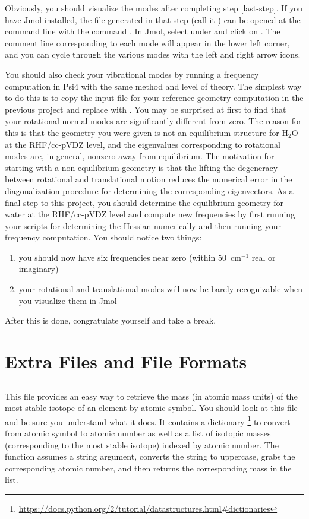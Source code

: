 \documentclass[11pt]{article}
\begin{document}
Obviously, you should visualize the modes after completing step \ref{last-step}.
If you have Jmol installed, the file generated in that step (call it ) can be opened at the command line with the command .
In Jmol, select  under  and click on .
The comment line corresponding to each mode will appear in the lower left corner, and you can cycle through the various modes with the left and right arrow icons.

You should also check your vibrational modes by running a frequency computation in Psi4 with the same method and level of theory.
The simplest way to do this is to copy the input file for your reference geometry computation in the previous project and replace  with .
You may be surprised at first to find that your rotational normal modes are significantly different from zero.
The reason for this is that the geometry you were given is not an equilibrium structure for H$_2$O at the RHF/cc-pVDZ level, and the eigenvalues corresponding to rotational modes are, in general, nonzero away from equilibrium.
The motivation for starting with a non-equilibrium geometry is that the lifting the degeneracy between rotational and translational motion reduces the numerical error in the diagonalization procedure for determining the corresponding eigenvectors.
As a final step to this project, you should determine the equilibrium geometry for water at the RHF/cc-pVDZ level and compute new frequencies by first running your scripts for determining the Hessian numerically and then running your frequency computation.
You should notice two things:
\begin{enumerate}
	\item you should now have six frequencies near zero (within $50$~cm$^{-1}$ real or imaginary)
	\item your rotational and translational modes will now be barely recognizable when you visualize them in Jmol
\end{enumerate}
After this is done, congratulate yourself and take a break.


\newpage
\section{Extra Files and File Formats}
\subsection{}
This file provides an easy way to retrieve the mass (in atomic mass units) of the most stable isotope of an element by atomic symbol.
You should look at this file and be sure you understand what it does.
It contains a dictionary \footnote{\url{https://docs.python.org/2/tutorial/datastructures.html\#dictionaries}} to convert from atomic symbol to atomic number as well as a list of isotopic masses (corresponding to the most stable isotope) indexed by atomic number.
The  function assumes a string argument, converts the string to uppercase, grabs the corresponding atomic number, and then returns the corresponding mass in the list.
\end{document}
